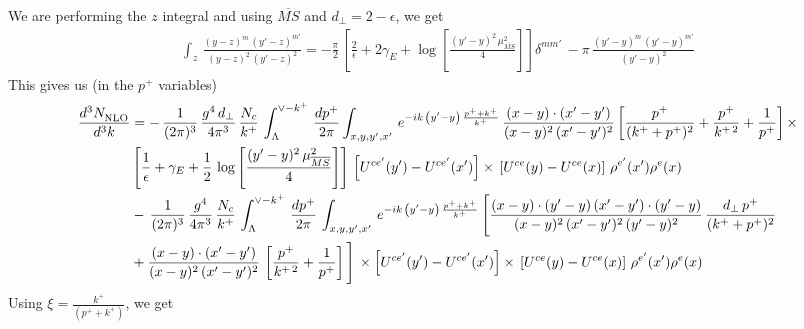 \documentclass[9pt]{article}
\numberwithin{equation}{section}
\begin{document}
We are performing the $z$ integral and using $\overline{MS}$ and $d_{\perp} = 2-\epsilon$, we get
\begin{align}
    \int_{z}\, \frac{(y-z)^{m}\,(y'-z)^{m'}}{(y-z)^{2}\,(y'-z)^{2}} = -\frac{\pi}{2}\, \left[\frac{2}{\epsilon} +2\gamma_{E} + \log{\left[\frac{(y'-y)^{2}\,\mu^{2}_{\overline{MS}}}{4}\right]}\right]\delta^{mm'}\, - \pi\, \frac{(y'-y)^{m}\,(y'-y)^{m'}}{(y'-y)^{2}}
\end{align}
This gives us (in the $p^{+}$ variables)
\begin{align}
     \frac{d^{3}N_{\rm NLO}^{\rm}}{d^{3}k}  & = -\,\frac{1}{(2\pi)^{3}}\,\frac{g^{4}\,d_{\perp}}{4\pi^{3}}\,\frac{N_{c}}{k^{+}}\,\int_{\Lambda}^{\vee-k^{+}}\, \frac{dp^{+}}{2\pi}\int_{x,y,y^{\prime},x'}\,e^{-ik\,\left(y'-y\right)\,\frac{p^{+}+k^{+}}{k^{+}}}\,\frac{(x-y)\cdot (x'-y')}{(x-y)^{2}\,(x'-y')^{2}}\,\bigg[\frac{p^{+}}{(k^{+}+p^{+})^{2}} + \frac{p^{+}}{k^{+\,2}}+\frac{1}{p^{+}}\bigg]\,\times\notag \\ & \left[\frac{1}{\epsilon} +\gamma_{E} +\frac{1}{2}\,\log{\left[\frac{(y'-y)^{2}\,\mu^{2}_{\overline{MS}}}{4}\right]}\right]\,\left[U^{ce'}(y') - U^{ce'}(x')\right] \times\, \left[U^{ce}(y) - U^{ce}(x)\right]\, \rho^{e'}(x') \rho^{e}(x)\notag \\ & -\,\frac{1}{(2\pi)^{3}}\,\frac{g^{4}}{4\pi^{3}}\,\frac{N_{c}}{k^{+}}\,\int_{\Lambda}^{\vee-k^{+}}\, \frac{dp^{+}}{2\pi}\,\int_{x,y,y^{\prime},x'}\,e^{-ik\,\left(y'-y\right)\,\frac{p^{+}+k^{+}}{k^{+}}}\,\Bigg[\frac{(x-y)\cdot (y'-y)\, (x'-y')\cdot (y'-y)}{(x-y)^{2}\,(x'-y')^{2}\,(y'-y)^{2}}\,\frac{d_{\perp}\,p^{+}}{(k^{+}+p^{+})^{2}}\notag \\ & + \frac{(x-y)\cdot (x'-y')}{(x-y)^{2}\,(x'-y')^{2}}\,\left[\frac{p^{+}}{k^{+\,2}} + \frac{1}{p^{+}}\right]\Bigg]\,\times \left[U^{ce'}(y') - U^{ce'}(x')\right] \times\, \left[U^{ce}(y) - U^{ce}(x)\right]\, \rho^{e'}(x') \rho^{e}(x)
\end{align}
Using $\xi = \frac{k^{+}}{(p^{+}+k^{+})}$, we get
\end{document}
